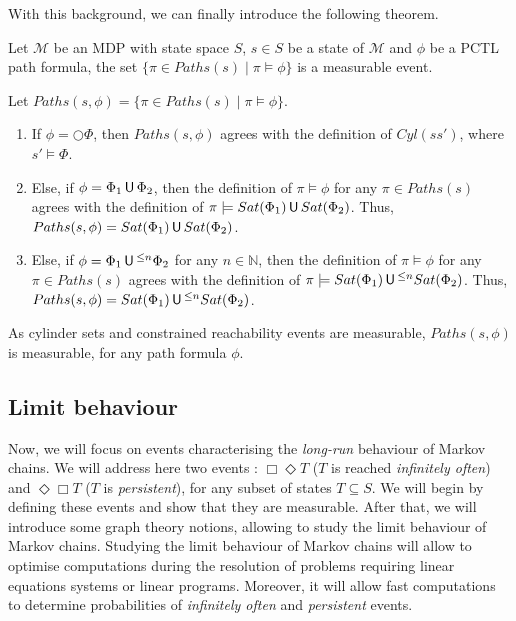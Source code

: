 With this background, we can finally introduce the following theorem.

\begin{theorem}
  Let $\mathcal{M}$ be an MDP with state space $S$, $s \in S$ be a state of $\mathcal{M}$ and $\phi$ be a PCTL path formula, the set $\{ \pi \in Paths(s) \; | \; \pi \models \phi \}$ is a measurable event.
\end{theorem}

\begin{proof2}
Let $Paths(s, \phi) = \{ \pi \in Paths(s) \; | \; \pi \models \phi \}$.
\begin{enumerate}
  \item If $\phi = \bigcirc \Phi$, then $Paths(s, \phi)$ agrees with the definition of $Cyl(ss')$, where $s' \models \Phi$.
  \item Else, if $\phi = \Phi_1 \,\text{\sffamily U}\, \Phi_2$, then the definition of
  $\pi \models \phi$ for any $\pi \in Paths(s)$ agrees with the definition of
  $\pi \models Sat(\Phi_1) \,\text{\sffamily U}\, Sat(\Phi_2)$.
  Thus, $Paths(s, \phi) = Sat(\Phi_1) \,\text{\sffamily U}\, Sat(\Phi_2)$.
  \item Else, if $\phi = \Phi_1 \,\text{\sffamily U}\,^{\leq n}\Phi_2$ for any $n \in \mathbb{N}$, then the definition of
  $\pi \models \phi$ for any $\pi \in Paths(s)$ agrees with the definition of
  $\pi \models Sat(\Phi_1) \,\text{\sffamily U}\,^{\leq n} Sat(\Phi_2)$.
  Thus, $Paths(s, \phi) = Sat(\Phi_1) \,\text{\sffamily U}\,^{\leq n} Sat(\Phi_2)$.
\end{enumerate}
As cylinder sets and constrained reachability events are measurable, $Paths(s, \phi)$ is measurable, for any path formula $\phi$.
\end{proof2}

\subsection{Limit behaviour}
Now, we will focus on events characterising the \textit{long-run} behaviour of Markov chains. We will address here two events : $\Box\Diamond T$ ($T$ is reached \textit{infinitely often})
and $\Diamond \Box T$ ($T$ is \textit{persistent}), for any subset of states $T \subseteq S$.
We will begin by defining these events and show that they are measurable. After that, we will introduce some graph theory notions, allowing to study the limit behaviour of Markov chains.
Studying the limit behaviour of Markov chains will allow to optimise
computations during the resolution of problems requiring linear equations systems or linear programs. Moreover, it will allow fast computations to determine probabilities of \textit{infinitely often} and \textit{persistent} events.

